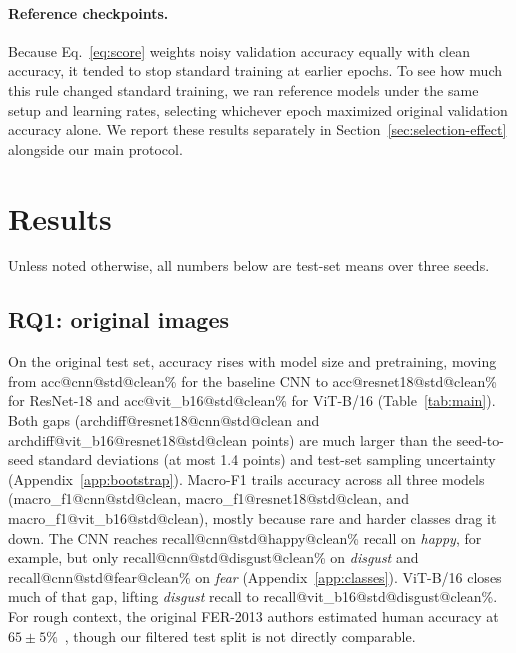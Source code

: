 \documentclass{article}
\begin{document}
\paragraph{Reference checkpoints.}
\label{sec:ref}
Because Eq.~\eqref{eq:score} weights noisy validation accuracy equally with clean accuracy, it tended to stop standard
training at earlier epochs. To see how much this rule changed standard training, we ran reference models under the same
setup and learning rates, selecting whichever epoch maximized original validation accuracy alone. We report these results separately in Section~\ref{sec:selection-effect} alongside our main protocol.

\section{Results}
\label{sec:results}

Unless noted otherwise, all numbers below are test-set means over three seeds.

\begin{table}[t]
  \caption{Test accuracy and macro-F1 (\%) on original images and averaged over the five primary severity levels of
  each degradation (mean $\pm$ sample standard deviation over three seeds; best mean per column in bold).}
  \label{tab:main}
  \centering
  \small
  \setlength{\tabcolsep}{4.5pt}
  \resizebox{\linewidth}{!}{}
\end{table}

\subsection{RQ1: original images}
\label{sec:rq1}

On the original test set, accuracy rises with model size and pretraining, moving from \num{acc@cnn@std@clean}\%
for the baseline CNN to \num{acc@resnet18@std@clean}\% for ResNet-18 and \num{acc@vit_b16@std@clean}\% for ViT-B/16
(Table~\ref{tab:main}). Both gaps (\num{archdiff@resnet18@cnn@std@clean} and \num{archdiff@vit_b16@resnet18@std@clean}
points) are much larger than the seed-to-seed standard deviations (at most 1.4 points) and test-set sampling
uncertainty (Appendix~\ref{app:bootstrap}). Macro-F1 trails accuracy across all three models
(\num{macro_f1@cnn@std@clean}, \num{macro_f1@resnet18@std@clean}, and \num{macro_f1@vit_b16@std@clean}), mostly
because rare and harder classes drag it down. The CNN reaches \num{recall@cnn@std@happy@clean}\% recall on \emph{happy},
for example, but only \num{recall@cnn@std@disgust@clean}\% on \emph{disgust} and \num{recall@cnn@std@fear@clean}\% on
\emph{fear} (Appendix~\ref{app:classes}). ViT-B/16 closes much of that gap, lifting \emph{disgust} recall to
\num{recall@vit_b16@std@disgust@clean}\%. For rough context, the original FER-2013 authors estimated human accuracy at
$65\pm5\%$~\cite{goodfellow2013challenges}, though our filtered test split is not directly comparable.
\end{document}
